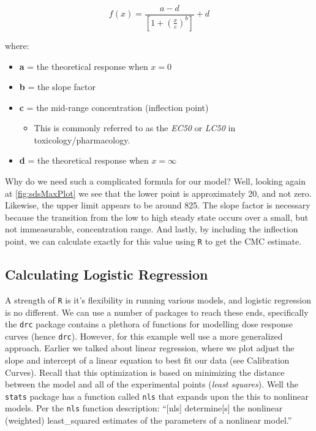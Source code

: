 \documentclass[
]{book}
\providecommand{\tightlist}{%
  \setlength{\itemsep}{0pt}\setlength{\parskip}{0pt}}
\begin{document}
\[f(x) =  \frac{a - d}{\left[ 1 + \left( \frac{x}{c} \right)^b \right ]} + d\]

where:

\begin{itemize}
\tightlist
\item
  \textbf{a} = the theoretical response when \(x = 0\)
\item
  \textbf{b} = the slope factor
\item
  \textbf{c} = the mid-range concentration (inflection point)

  \begin{itemize}
  \tightlist
  \item
    This is commonly referred to as the \emph{EC50} or \emph{LC50} in toxicology/pharmacology.
  \end{itemize}
\item
  \textbf{d} = the theoretical response when \(x = \infty\)
\end{itemize}

Why do we need such a complicated formula for our model? Well, looking again at \ref{fig:sdsMaxPlot} we see that the lower point is approximately 20, and not zero. Likewise, the upper limit appears to be around 825. The slope factor is necessary because the transition from the low to high steady state occurs over a small, but not immeasurable, concentration range. And lastly, by including the inflection point, we can calculate exactly for this value using \texttt{R} to get the CMC estimate.

\hypertarget{calculating-logistic-regression}{%
\subsection{Calculating Logistic Regression}\label{calculating-logistic-regression}}

A strength of \texttt{R} is it's flexibility in running various models, and logistic regression is no different. We can use a number of packages to reach these ends, specifically the \texttt{drc} package contains a plethora of functions for modelling dose response curves (hence \texttt{drc}). However, for this example well use a more generalized approach. Earlier we talked about linear regression, where we plot adjust the slope and intercept of a linear equation to best fit our data (see Calibration Curves). Recall that this optimization is based on minimizing the distance between the model and all of the experimental points (\emph{least squares}). Well the \texttt{stats} package has a function called \texttt{nls} that expands upon the this to nonlinear models. Per the \texttt{nls} function description: ``{[}nls{]} determine{[}s{]} the nonlinear (weighted) least\_squared estimates of the parameters of a nonlinear model.''
\end{document}

